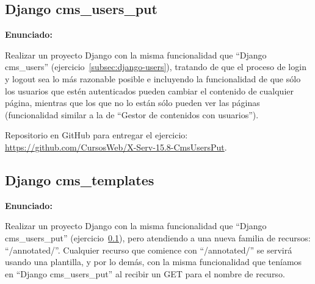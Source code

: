 



\subsection{Django cms\_users\_put}
\label{subsec:django-users-put}

\textbf{Enunciado:}

Realizar un proyecto Django con la misma funcionalidad que ``Django cms\_users'' (ejercicio~\ref{subsec:django-users}), tratando de que el proceso de login y logout sea lo más razonable posible e incluyendo la funcionalidad de que sólo los usuarios que estén autenticados pueden cambiar el contenido de cualquier página, mientras que los que no lo están sólo pueden ver las páginas (funcionalidad similar a la de ``Gestor de contenidos con usuarios'').

Repositorio en GitHub para entregar el ejercicio: \\ 
\url{https://github.com/CursosWeb/X-Serv-15.8-CmsUsersPut}.


\subsection{Django cms\_templates}
\label{subsec:django-templates}

\textbf{Enunciado:}

Realizar un proyecto Django con la misma funcionalidad que ``Django cms\_users\_put'' (ejercicio~\ref{subsec:django-users-put}), pero atendiendo a una nueva familia de recursos: ``/annotated/''. Cualquier recurso que comience con ``/annotated/'' se servirá usando una plantilla, y por lo demás, con la misma funcionalidad que teníamos en ``Django cms\_users\_put'' al recibir un GET para el nombre de recurso.

